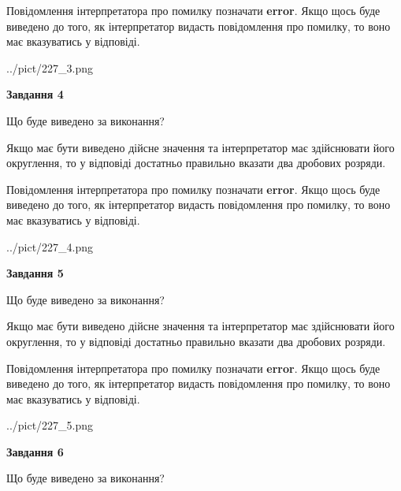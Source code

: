 \documentclass[12pt, ukrainian]{article}
\begin{document}
{\begin {Large}
Повідомлення інтерпретатора про помилку позначати \textbf{error}.
Якщо щось буде виведено до того, як інтерпретатор видасть повідомлення про помилку, 
то воно має вказуватись у відповіді. \par

\begin{center}
	{../pict/227_3.png}
\end{center}
\newpage

{\begin {center}\textbf{Завдання 4}\end {center}}\par
Що буде виведено за виконання? \par

Якщо має бути виведено дійсне значення та інтерпретатор має здійснювати його округлення, 
то у відповіді достатньо правильно вказати два дробових розряди.

Повідомлення інтерпретатора про помилку позначати \textbf{error}.
Якщо щось буде виведено до того, як інтерпретатор видасть повідомлення про помилку, 
то воно має вказуватись у відповіді. \par

\begin{center}
	{../pict/227_4.png}
\end{center}
\newpage

{\begin {center}\textbf{Завдання 5}\end {center}}\par
Що буде виведено за виконання? \par

Якщо має бути виведено дійсне значення та інтерпретатор має здійснювати його округлення, 
то у відповіді достатньо правильно вказати два дробових розряди.

Повідомлення інтерпретатора про помилку позначати \textbf{error}.
Якщо щось буде виведено до того, як інтерпретатор видасть повідомлення про помилку, 
то воно має вказуватись у відповіді. \par

\begin{center}
	{../pict/227_5.png}
\end{center}
\newpage

{\begin {center}\textbf{Завдання 6}\end {center}}\par
Що буде виведено за виконання? \par


\end{Large}}
\end{document}
